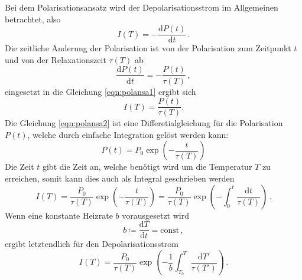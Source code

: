         \noindent Bei dem Polarisationsansatz wird der Depolarisationsstrom im Allgemeinen betrachtet, also 
        \begin{equation}
            I(T) = - \frac{\text{d} P(t)}{\text{d}t} \,.
            \label{eqn:polansa1}
        \end{equation}
        Die zeitliche Änderung der Polarisation ist von der Polarisation zum Zeitpunkt $t$ und von der Relaxationszeit $\tau(T)$ ab
        \begin{equation}
            \frac{\text{d} P(t)}{\text{d}t} = - \frac{P(t)}{\tau(T)} \, ,
            \label{eqn:polansa2}
        \end{equation}
        eingesetzt in die Gleichung \eqref{eqn:polansa1} ergibt 
        sich
        \begin{equation}
            I(T) = \frac{P(t)}{\tau(T)}.
            \label{eqn:polansa3}
        \end{equation}
        Die Gleichung \eqref{eqn:polansa2} ist eine Differetialgleichung für die Polarisation $P(t)$, welche durch einfache Integration gelöst werden kann:
        \begin{equation}
            P(t) = P_0 \exp\left(- \frac{t}{\tau(T)}\right)
            \label{eqn:polansa4}
        \end{equation}
        Die Zeit $t$ gibt die Zeit an, welche benötigt wird um die Temperatur $T$ zu erreichen, somit kann dies auch als Integral geschrieben werden 
        \begin{equation}
            I(T) = \frac{P_0}{\tau(T)} \exp\left( - \frac{t}{\tau(T)}\right) = \frac{P_0}{\tau(T)} \exp\left( - \int_0^t\frac{\text{d}t}{\tau(T)}\right)\, . 
            \label{eqn:polansa5}
        \end{equation}
        Wenn eine konstante Heizrate $b$ vorausgesetzt wird 
        \begin{equation}
            b \coloneq \frac{\text{d}T}{\text{d}t} = \text{const}\, , 
            \label{eqn:heizrate1}
        \end{equation}
        ergibt letztendlich für den Depolarisationsstrom
        \begin{equation}
            I(T) = \frac{P_0}{\tau(T)} \exp\left( - \frac{1}{b}\int_{T_0}^T\frac{\text{d}T'}{\tau(T')}\right)\, .
        \end{equation}

